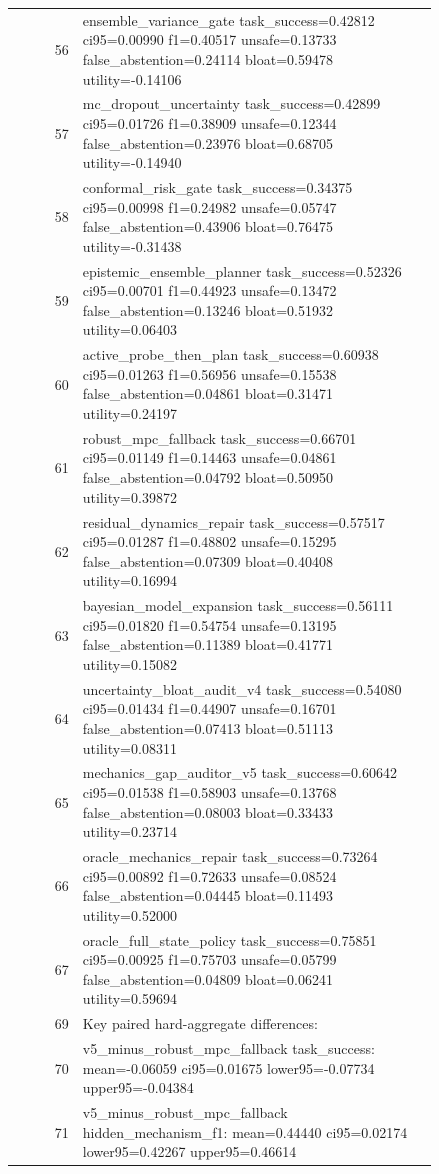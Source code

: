 \documentclass{article}
\begin{document}
\begin{center}
\begin{longtable}{rp{0.84\linewidth}}
56 & ensemble\_variance\_gate task\_success=0.42812 ci95=0.00990 f1=0.40517 unsafe=0.13733 false\_abstention=0.24114 bloat=0.59478 utility=-0.14106\\
57 & mc\_dropout\_uncertainty task\_success=0.42899 ci95=0.01726 f1=0.38909 unsafe=0.12344 false\_abstention=0.23976 bloat=0.68705 utility=-0.14940\\
58 & conformal\_risk\_gate task\_success=0.34375 ci95=0.00998 f1=0.24982 unsafe=0.05747 false\_abstention=0.43906 bloat=0.76475 utility=-0.31438\\
59 & epistemic\_ensemble\_planner task\_success=0.52326 ci95=0.00701 f1=0.44923 unsafe=0.13472 false\_abstention=0.13246 bloat=0.51932 utility=0.06403\\
60 & active\_probe\_then\_plan task\_success=0.60938 ci95=0.01263 f1=0.56956 unsafe=0.15538 false\_abstention=0.04861 bloat=0.31471 utility=0.24197\\
61 & robust\_mpc\_fallback task\_success=0.66701 ci95=0.01149 f1=0.14463 unsafe=0.04861 false\_abstention=0.04792 bloat=0.50950 utility=0.39872\\
62 & residual\_dynamics\_repair task\_success=0.57517 ci95=0.01287 f1=0.48802 unsafe=0.15295 false\_abstention=0.07309 bloat=0.40408 utility=0.16994\\
63 & bayesian\_model\_expansion task\_success=0.56111 ci95=0.01820 f1=0.54754 unsafe=0.13195 false\_abstention=0.11389 bloat=0.41771 utility=0.15082\\
64 & uncertainty\_bloat\_audit\_v4 task\_success=0.54080 ci95=0.01434 f1=0.44907 unsafe=0.16701 false\_abstention=0.07413 bloat=0.51113 utility=0.08311\\
65 & mechanics\_gap\_auditor\_v5 task\_success=0.60642 ci95=0.01538 f1=0.58903 unsafe=0.13768 false\_abstention=0.08003 bloat=0.33433 utility=0.23714\\
66 & oracle\_mechanics\_repair task\_success=0.73264 ci95=0.00892 f1=0.72633 unsafe=0.08524 false\_abstention=0.04445 bloat=0.11493 utility=0.52000\\
67 & oracle\_full\_state\_policy task\_success=0.75851 ci95=0.00925 f1=0.75703 unsafe=0.05799 false\_abstention=0.04809 bloat=0.06241 utility=0.59694\\
69 & Key paired hard-aggregate differences:\\
70 & v5\_minus\_robust\_mpc\_fallback task\_success: mean=-0.06059 ci95=0.01675 lower95=-0.07734 upper95=-0.04384\\
71 & v5\_minus\_robust\_mpc\_fallback hidden\_mechanism\_f1: mean=0.44440 ci95=0.02174 lower95=0.42267 upper95=0.46614\\

\end{longtable}
\end{center}
\end{document}
